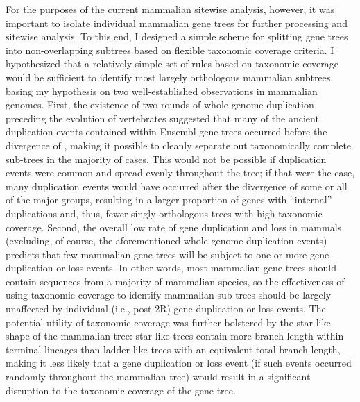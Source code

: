 For the purposes of the current mammalian sitewise analysis, however,
it was important to isolate individual mammalian gene trees for
further processing and sitewise analysis. To this end, I designed a
simple scheme for splitting gene trees into non-overlapping subtrees
based on flexible taxonomic coverage criteria. I hypothesized that a
relatively simple set of rules based on taxonomic coverage would be
sufficient to identify most largely orthologous mammalian subtrees,
basing my hypothesis on two well-established observations in mammalian
genomes. First, the existence of two rounds of whole-genome
duplication preceding the evolution of vertebrates \citep{TODO}
suggested that many of the ancient duplication events contained within
Ensembl gene trees occurred before the divergence of \mmls, making it
possible to cleanly separate out taxonomically complete \mmln
sub-trees in the majority of cases. This would not be possible if
duplication events were common and spread evenly throughout the \mmln
tree; if that were the case, many duplication events would have
occurred after the divergence of some or all of the major \mmln
groups, resulting in a larger proportion of \mmln genes with
``internal'' duplications and, thus, fewer singly orthologous trees
with high taxonomic coverage. Second, the overall low rate of gene
duplication and loss in mammals \citep{TODO, mammalian gene trees PLoS
  One} (excluding, of course, the aforementioned whole-genome
duplication events) predicts that few mammalian gene trees will be
subject to one or more gene duplication or loss events. In other
words, most mammalian gene trees should contain sequences from a
majority of mammalian species, so the effectiveness of using taxonomic
coverage to identify mammalian sub-trees should be largely unaffected
by individual (i.e., post-2R) gene duplication or loss events. The
potential utility of taxonomic coverage was further bolstered by the
star-like shape of the mammalian tree: star-like trees contain more
branch length within terminal lineages than ladder-like trees with an
equivalent total branch length, making it less likely that a gene
duplication or loss event (if such events occurred randomly throughout
the mammalian tree) would result in a significant disruption to the
taxonomic coverage of the gene tree.

